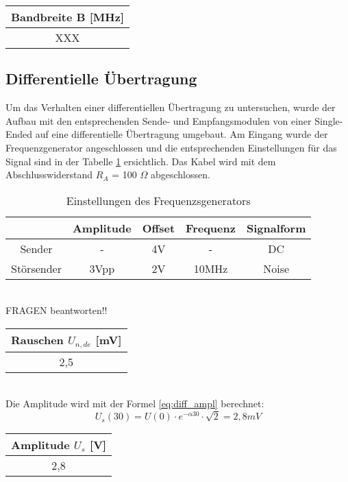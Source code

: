 \begin{table}[!h]
	\centering
	\begin{tabular}{|c|}
		\hline 
		Bandbreite B [MHz]		\\ 
		\hline 
		XXX		\\ 
		\hline 
	\end{tabular}
\end{table}



\subsection{Differentielle Übertragung}
Um das Verhalten einer differentiellen Übertragung zu untersuchen, wurde der Aufbau mit den entsprechenden Sende- und Empfangsmodulen von einer Single-Ended auf eine differentielle Übertragung umgebaut. Am Eingang wurde der Frequenzgenerator angeschlossen und die entsprechenden Einstellungen für das Signal sind in der Tabelle \ref{tb:einst_diff} ersichtlich. Das Kabel wird mit dem Abschlusswiderstand $R_A$ = 100 $\Omega$ abgeschlossen.


\begin{table}[!h]
	\centering
	\begin{tabular}{|c|c|c|c|c|}
	\hline 
			& Amplitude		& Offset 	& Frequenz 		& Signalform		\\ 
	\hline 
	Sender	& -			& 4V		& -			& DC			\\ 
	\hline 
	Störsender	& 3Vpp		& 2V		& 10MHz		& Noise 		\\ 
	\hline 
	\end{tabular}
	\caption{Einstellungen des Frequenzsgenerators}
	\label{tb:einst_diff}
\end{table}
~\\
FRAGEN beantworten!!

\begin{table}[!h]
	\centering
	\begin{tabular}{|c|}
		\hline 
		Rauschen $U_{n, de}$ [mV]		\\ 
		\hline 
		2,5	\\ 
		\hline 
	\end{tabular}
\end{table}
~\\
Die Amplitude wird mit der Formel \ref{eq:diff_ampl} berechnet:
\begin{equation}
	U_s(30) = U(0) \cdot e^{-\alpha 30} \cdot \sqrt{2} = 2,8mV
	\label{eq:diff_ampl}
\end{equation}
\begin{table}[!h]
	\centering
	\begin{tabular}{|c|}
		\hline 
		Amplitude $U_s$ [V]		\\ 
		\hline 
		2,8		\\ 
		\hline 
	\end{tabular}
\end{table}

